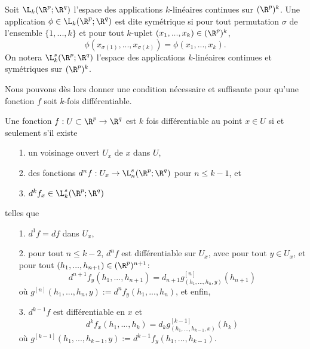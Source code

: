 \documentclass[class=report,crop=false]{standalone}
\begin{document}
\begin{definition}
\textcolor[rgb]{0.73,0.00,0.00}{
  Soit $\L_k(\R^p;\R^q)$ l'espace des applications $k$-lin\'eaires continues sur
  $(\R^p)^k$. Une application $\phi  \in \L_k(\R^p;\R^q)$ est dite sym\'etrique si pour tout permutation
  $\sigma$ de l'ensemble $\{1,...,k\}$ et pour tout $k$-uplet $(x_1,...,x_k) \in (\R^p)^k$,
  \begin{equation*}
    \phi(x_{\sigma(1)},...,x_{\sigma(k)})= \phi(x_1,...,x_k).
  \end{equation*}
  On notera $\L^s_k(\R^p;\R^q)$ l'espace des applications $k$-lin\'eaires continues et sym\'etriques sur $(\R^p)^k$.
}
 \end{definition}
\noindent Nous pouvons dès lors donner une condition nécessaire et suffisante pour qu'une fonction $f$ soit $k$-fois différentiable.
\begin{theoreme}
\textcolor[rgb]{0.44,0.00,0.87}{
   Une fonction $f: U \subset \R^p\rightarrow \R^q$ est $k$ fois diff\'erentiable au point $x \in U$
  si et seulement   s'il existe
  \begin{itemize}
    \item[1.] un voisinage ouvert $U_x$ de $x$ dans $U$,
    \item[2.] des fonctions $d^nf : U_x \rightarrow \L^s_n(\R^p;\R^q)$ pour $n \leq k-1$, et
    \item[3.] $d^kf_x \in \L^s_k (\R^p;\R^q)$
  \end{itemize}
 telles que
 \begin{itemize}
   \item[1.] $d^1f=df$ dans $U_x$, 
   \item[2.] pour tout $n \leq k-2$, $d^nf$ est diff\'erentiable sur $U_x$, avec pour tout $y \in U_x$, et
   pour tout $(h_1,...,h_{n+1}) \in (\R^p)^{n+1}$:
   \begin{equation*}
     d^{n+1}f_y(h_1,...,h_{n+1})=d_{n+1}g_{(h_1,...,h_n,y)}^{[n]}(h_{n+1}) 
   \end{equation*}
  où $g^{[n]}(h_1,...,h_n,y):=d^nf_y(h_1,...,h_n)$,
   et enfin,
   \item[3.] $d^{k-1}f$ est diff\'erentiable en $x$ et
   \begin{equation*}
     d^kf_x(h_1,...,h_k)=d_kg_{(h_1,...,h_{k-1},x)}^{[k-1]}(h_k) 
   \end{equation*}
où $g^{[k-1]}(h_1,...,h_{k-1},y):=d^{k-1}f_y(h_1,...,h_{k-1})$.
 \end{itemize}
 }
\end{theoreme}
\end{document}
